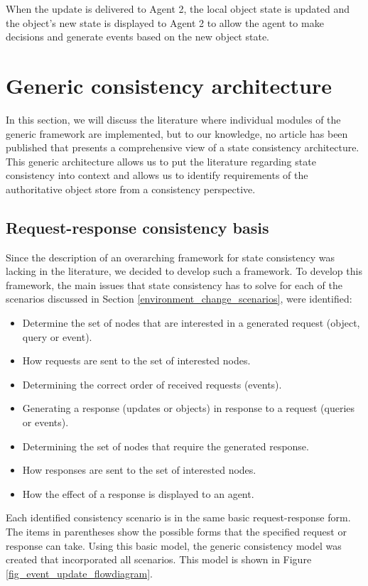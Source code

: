 When the update is delivered to Agent 2, the local object state is updated and the object's new state is displayed to Agent 2 to allow the agent to make decisions and generate events based on the new object state.

\section{Generic consistency architecture}
\label{generic_event_update_model}

In this section, we will discuss the literature where individual modules of the generic framework are implemented, but to our knowledge, no article has been published that presents a comprehensive view of a state consistency architecture. This generic architecture allows us to put the literature regarding state consistency into context and allows us to identify requirements of the authoritative object store from a consistency perspective.

\subsection{Request-response consistency basis}
Since the description of an overarching framework for state consistency was lacking in the literature, we decided to develop such a framework. To develop this framework, the main issues that state consistency has to solve for each of the scenarios discussed in Section \ref{environment_change_scenarios}, were identified:
%
\begin{itemize}
\item Determine the set of nodes that are interested in a generated request (object, query or event).
\item How requests are sent to the set of interested nodes.
\item Determining the correct order of received requests (events).
\item Generating a response (updates or objects) in response to a request (queries or events).
\item Determining the set of nodes that require the generated response.
\item How responses are sent to the set of interested nodes.
\item How the effect of a response is displayed to an agent.
\end{itemize}

Each identified consistency scenario is in the same basic request-response form. The items in parentheses show the possible forms that the specified request or response can take. Using this basic model, the generic consistency model was created that incorporated all scenarios. This model is shown in Figure \ref{fig_event_update_flowdiagram}.

